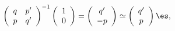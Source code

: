 \begin{equation}
\left(
 \begin{array}{cc}
   q & p^\prime\\
   p & q^\prime
 \end{array}
\right)^{-1}
\left(
 \begin{array}{c}
   1\\
   0 
 \end{array}
\right)
=
\left(
 \begin{array}{c}
   q ^\prime \\
   -p
 \end{array}
\right) 
\simeq
\left(
 \begin{array}{c}
   q^\prime \\
   p
 \end{array}
\right) \es,
\end{equation}

